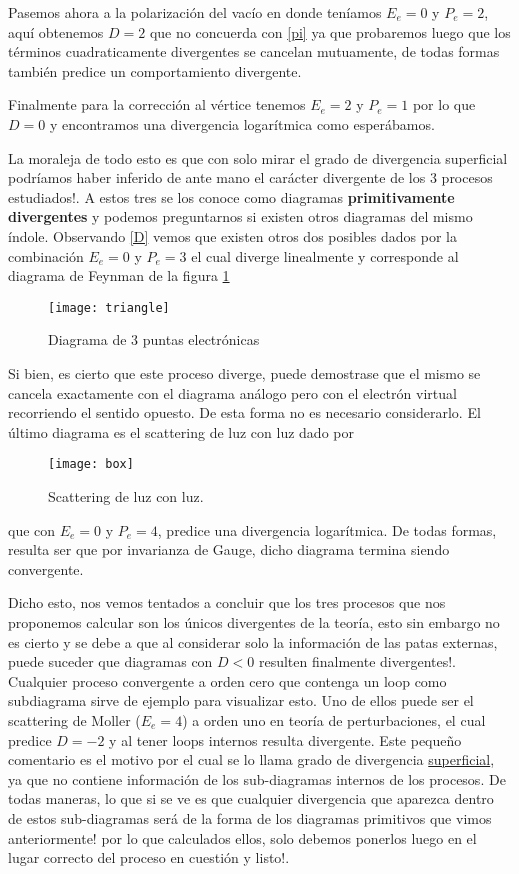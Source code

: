 \documentclass[tickz]{article}
\numberwithin{equation}{section}
\begin{document}
Pasemos ahora a la polarización del vacío en donde teníamos $ E_e=0 $ y $ P_e=2 $, aquí obtenemos $ D=2 $ que no concuerda con \ref{pi} ya que probaremos luego que los términos cuadraticamente divergentes se cancelan mutuamente, de todas formas también predice un comportamiento divergente.

Finalmente para la corrección al vértice tenemos $ E_e=2 $ y $ P_e=1 $ por lo que $ D=0 $ y encontramos una divergencia logarítmica como esperábamos. 

La moraleja de todo esto es que con solo mirar el grado de divergencia superficial podríamos haber inferido de ante mano el carácter divergente de los 3 procesos estudiados!. A estos tres se los conoce como diagramas \textbf{primitivamente divergentes} y podemos preguntarnos si existen otros diagramas del mismo índole. Observando  \ref{D} vemos que existen otros dos posibles dados por la combinación $ E_e=0 $ y $ P_e=3 $ el cual diverge linealmente y corresponde al diagrama de Feynman de la figura \ref{fig_triangle}

\begin{figure}[h]
	\centering
	\texttt{[image: triangle]}
	\caption{Diagrama de 3 puntas electrónicas}
	\label{fig_triangle}
\end{figure}

Si bien, es cierto que este proceso diverge, puede demostrase que el mismo se cancela exactamente con el diagrama análogo pero con el electrón virtual recorriendo el sentido opuesto. De esta forma no es necesario considerarlo. El último diagrama es el scattering de luz con luz dado por

\begin{figure}[h]
	\centering
	\texttt{[image: box]}
	\caption{Scattering de luz con luz.}
	\label{fig_box}
\end{figure}

que con $ E_e=0 $ y $ P_e=4 $, predice una divergencia logarítmica. De todas formas, resulta ser que por invarianza de Gauge, dicho diagrama termina siendo convergente.

\newpage

Dicho esto, nos vemos tentados a concluir que los tres procesos que nos proponemos calcular son los únicos divergentes de la teoría, esto sin embargo no es cierto y se debe a que al considerar solo la información de las patas externas, puede suceder que diagramas con $ D<0 $ resulten finalmente divergentes!. Cualquier proceso convergente a orden cero que contenga un loop como subdiagrama sirve de ejemplo para visualizar esto. Uno de ellos puede ser el scattering de Moller ($ E_e=4 $) a orden uno en teoría de perturbaciones, el cual predice $ D=-2 $ y al tener loops internos resulta divergente. Este pequeño comentario es el motivo por el cual se lo llama grado de divergencia \underline{superficial}, ya que no contiene información de los sub-diagramas internos de los procesos. De todas maneras, lo que si se ve es que cualquier divergencia que aparezca dentro de estos sub-diagramas será de la forma de los diagramas primitivos que vimos anteriormente! por lo que calculados ellos, solo debemos ponerlos luego en el lugar correcto del proceso en cuestión y listo!.\\
\end{document}

